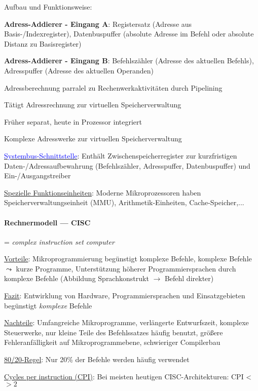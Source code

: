 \begin{items}
	\item Aufbau und Funktionsweise:
	\begin{items}
		\item \textbf{Adress-Addierer - Eingang A}: Registersatz (Adresse aus Basis-/Indexregister), Datenbuspuffer (absolute Adresse im Befehl oder absolute Distanz zu Basisregister)
		\item \textbf{Adress-Addierer - Eingang B}: Befehlszähler (Adresse des aktuellen Befehls), Adresspuffer (Adresse des aktuellen Operanden)
		\item Adressberechnung parralel zu Rechenwerkaktivitäten durch Pipelining
		\item Tätigt Adressrechnung zur virtuellen Speicherverwaltung
		\item Früher separat, heute in Prozessor integriert
		\item Komplexe Adresswerke zur virtuellen Speicherverwaltung
	\end{items}

	\item \underline{\textcolor{blue}{Systembus-Schnittstelle}}: Enthält Zwischenspeicherregister zur kurzfristigen Daten-/Adressaufbewahrung (Befehlszähler, Adresspuffer, Datenbuspuffer) und Ein-/Ausgangstreiber

	\item \underline{Spezielle Funktionseinheiten}: Moderne Mikroprozessoren haben Speicherverwaltungseinheit (MMU), Arithmetik-Einheiten, Cache-Speicher,...
\end{items}

\newpage

\paragraph{Rechnermodell --- CISC}
\begin{items}
	\item = \emph{complex instruction set computer}
	\item \underline{Vorteile}: Mikroprogrammierung begünstigt komplexe Befehle, komplexe Befehle $\leadsto$ kurze Programme, Unterstützung höherer Programmiersprachen durch komplexe Befehle (Abbildung Sprachkonstrukt $\to$ Befehl direkter)
	\item \underline{Fazit}: Entwirklung von Hardware, Programmiersprachen und Einsatzgebieten begünstigt \emph{komplexe} Befehle
	\item \underline{Nachteile}: Umfangreiche Mikroprogramme, verlängerte Entwurfszeit, komplexe Steuerwerke, nur kleine Teile des Befehlssatzes häufig benutzt, größere Fehleranfälligkeit auf Mikroprogrammebene, schwieriger Compilerbau
	\item \underline{80/20-Regel}: Nur 20\% der Befehle werden häufig verwendet
	\item \underline{Cycles per instruction (CPI)}: Bei meisten heutigen CISC-Architekturen: CPI <$>2$
\end{items}

